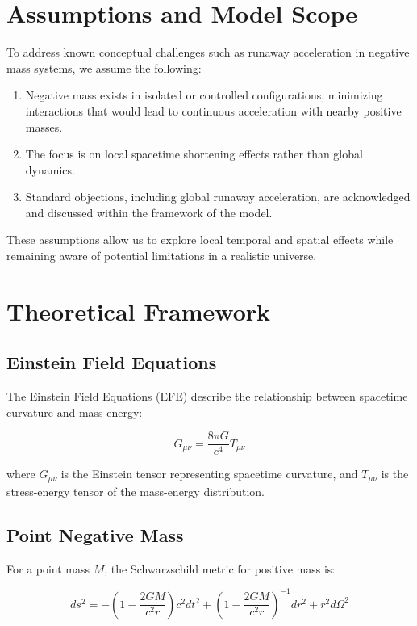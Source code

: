 \documentclass[12pt]{article}
\begin{document}
\section{Assumptions and Model Scope}
To address known conceptual challenges such as runaway acceleration in negative mass systems, we assume the following:
\begin{enumerate}
    \item Negative mass exists in isolated or controlled configurations, minimizing interactions that would lead to continuous acceleration with nearby positive masses.
    \item The focus is on local spacetime shortening effects rather than global dynamics.
    \item Standard objections, including global runaway acceleration, are acknowledged and discussed within the framework of the model.
\end{enumerate}
These assumptions allow us to explore local temporal and spatial effects while remaining aware of potential limitations in a realistic universe.

\section{Theoretical Framework}

\subsection{Einstein Field Equations}
The Einstein Field Equations (EFE) describe the relationship between spacetime curvature and mass-energy:

\begin{equation}
G_{\mu\nu} = \frac{8 \pi G}{c^4} T_{\mu\nu}
\end{equation}

where $G_{\mu\nu}$ is the Einstein tensor representing spacetime curvature, and $T_{\mu\nu}$ is the stress-energy tensor of the mass-energy distribution.

\subsection{Point Negative Mass}
For a point mass $M$, the Schwarzschild metric for positive mass is:

\begin{equation}
ds^2 = -\left(1 - \frac{2GM}{c^2 r}\right)c^2 dt^2 + \left(1 - \frac{2GM}{c^2 r}\right)^{-1} dr^2 + r^2 d\Omega^2
\end{equation}
\end{document}
